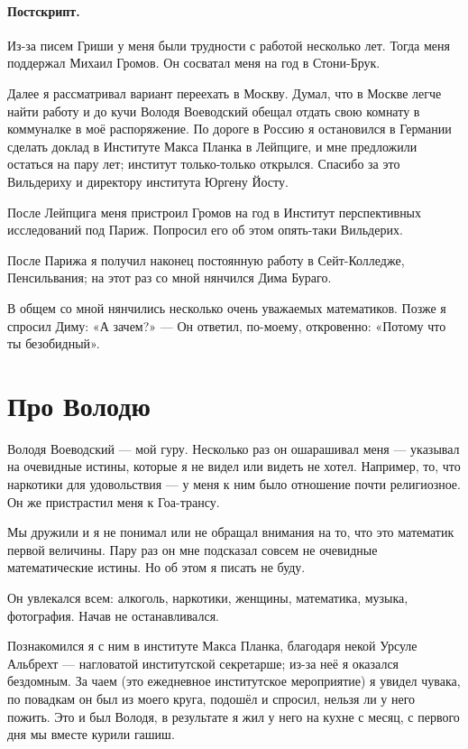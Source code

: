 \documentclass{book}
\begin{document}
\paragraph{Постскрипт.}
Из-за писем Гриши у меня были трудности с работой несколько лет.
Тогда меня поддержал Михаил Громов.
Он сосватал меня на год в Стони-Брук.

Далее я рассматривал вариант переехать в Москву.
Думал, что в Москве легче найти работу и до кучи Володя Воеводский обещал отдать свою комнату в коммуналке в моё распоряжение.
По дороге в Россию я остановился в Германии сделать доклад в Институте Макса Планка в Лейпциге, и мне предложили остаться на пару лет; 
институт только-только открылся.
Спасибо за это Вильдериху и директору института Юргену Йосту.

После Лейпцига меня пристроил Громов на год в Институт перспективных исследований под Париж.
Попросил его об этом опять-таки Вильдерих.

После Парижа я получил наконец постоянную работу в Сейт-Колледже, Пенсильвания;
на этот раз со мной нянчился Дима Бураго.

В общем со мной нянчились несколько очень уважаемых математиков.
Позже я спросил Диму: «А зачем?» --- Он ответил, по-моему, откровенно: «Потому что ты безобидный».

\section*{Про Володю}

Володя Воеводский --- мой гуру.
Несколько раз он ошарашивал меня --- указывал на очевидные истины, которые я не видел или видеть не хотел.
Например, то, что наркотики для удовольствия --- у меня к ним было отношение почти религиозное.
Он же пристрастил меня к Гоа-трансу.

Мы дружили и я не понимал или не обращал внимания на то, что это математик первой величины.
Пару раз он мне подсказал совсем не очевидные математические истины.
Но об этом я писать не буду.

Он увлекался всем: алкоголь, наркотики, женщины, математика, музыка, фотография.
Начав не останавливался.

Познакомился я с ним в институте Макса Планка, благодаря некой Урсуле Альбрехт --- нагловатой институтской секретарше;
из-за неё я оказался бездомным.
За чаем (это ежедневное институтское мероприятие) я увидел чувака, по повадкам он был из моего круга, подошёл и спросил, нельзя ли у него пожить.
Это и был Володя, в результате я жил у него на кухне с месяц, с первого дня мы вместе курили гашиш.
\end{document}
